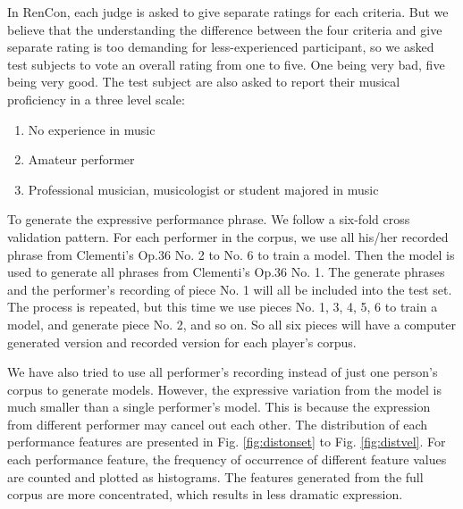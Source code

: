 In RenCon, each judge is asked to give separate ratings for each criteria. But we believe that the understanding the difference between the four criteria and give separate rating is too demanding for less-experienced participant, so we asked test subjects to vote an overall rating from one to five. One being very bad, five being very good. The test subject are also asked to report their musical proficiency in a three level scale:
\begin{enumerate}
   \item No experience in music 
   \item Amateur performer
   \item Professional musician, musicologist or student majored in music
\end{enumerate}

To generate the expressive performance phrase. We follow a six-fold cross validation pattern. For each performer in the corpus, we use all his/her recorded phrase from Clementi's Op.36 No. 2 to No. 6 to train a model. Then the model is used to generate all phrases from Clementi's Op.36 No. 1. The generate phrases and the performer's recording of piece No. 1 will all be included into the test set.  The process is repeated, but this time we use pieces No. 1, 3, 4, 5, 6 to train a model, and generate piece No. 2, and so on. So all six pieces will have a computer generated version and recorded version for each player's corpus.


We have also tried to use all performer's recording instead of just one person's corpus to generate models. However, the expressive variation from the model is much smaller than a single performer's model. This is because the expression from different performer may cancel out each other. The distribution of each performance features are presented in Fig. \ref{fig:distonset} to Fig. \ref{fig:distvel}. For each performance feature, the frequency of occurrence of different feature values are counted and plotted as histograms. The features generated from the full corpus are more concentrated, which results in less dramatic expression.


